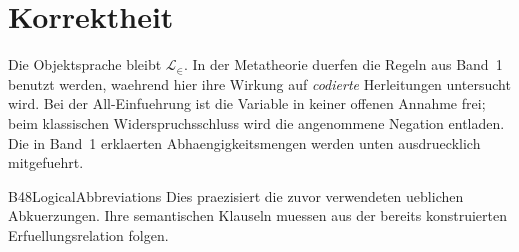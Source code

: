 \section{Korrektheit}

Die Objektsprache bleibt \(\mathcal L_\in\).
In der Metatheorie duerfen die Regeln aus Band~1 benutzt werden,
waehrend hier ihre Wirkung auf \emph{codierte} Herleitungen untersucht
wird. Bei der All-Einfuehrung ist die Variable in keiner offenen
Annahme frei; beim klassischen Widerspruchsschluss wird die
angenommene Negation entladen. Die in Band~1 erklaerten
Abhaengigkeitsmengen werden unten ausdruecklich mitgefuehrt.

{B48LogicalAbbreviations}{
}
Dies praezisiert die zuvor verwendeten ueblichen Abkuerzungen.
Ihre semantischen Klauseln muessen aus der bereits konstruierten
Erfuellungsrelation folgen.

